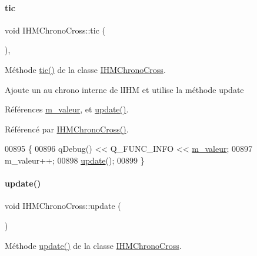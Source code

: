 \paragraph{\texorpdfstring{tic}{tic}}
{\footnotesize\ttfamily void I\+H\+M\+Chrono\+Cross\+::tic (\begin{DoxyParamCaption}{ }\end{DoxyParamCaption})\hspace{0.3cm}{\ttfamily [private]}, {\ttfamily [slot]}}



Méthode \hyperlink{class_i_h_m_chrono_cross_a9706094a679e33f3595e28776596a91b}{tic()} de la classe \hyperlink{class_i_h_m_chrono_cross}{I\+H\+M\+Chrono\+Cross}. 

Ajoute un au chrono interne de l\textquotesingle{}I\+HM et utilise la méthode update 

Références \hyperlink{class_i_h_m_chrono_cross_a4bb2449f0b2cc9891c09fa3e32f56229}{m\+\_\+valeur}, et \hyperlink{class_i_h_m_chrono_cross_a2cc8b686168528ab0d642a0cba6e1c5a}{update()}.



Référencé par \hyperlink{class_i_h_m_chrono_cross_a479fc90733fba3e65fb06aa4a3adc02e}{I\+H\+M\+Chrono\+Cross()}.


\begin{DoxyCode}
00895 \{
00896     qDebug() << Q\_FUNC\_INFO << \hyperlink{class_i_h_m_chrono_cross_a4bb2449f0b2cc9891c09fa3e32f56229}{m\_valeur};
00897     m\_valeur++;
00898     \hyperlink{class_i_h_m_chrono_cross_a2cc8b686168528ab0d642a0cba6e1c5a}{update}();
00899 \}
\end{DoxyCode}
\mbox{\label{class_i_h_m_chrono_cross_a2cc8b686168528ab0d642a0cba6e1c5a}} 
\paragraph{\texorpdfstring{update()}{update()}}
{\footnotesize\ttfamily void I\+H\+M\+Chrono\+Cross\+::update (\begin{DoxyParamCaption}{ }\end{DoxyParamCaption})\hspace{0.3cm}{\ttfamily [private]}}



Méthode \hyperlink{class_i_h_m_chrono_cross_a2cc8b686168528ab0d642a0cba6e1c5a}{update()} de la classe \hyperlink{class_i_h_m_chrono_cross}{I\+H\+M\+Chrono\+Cross}. 


